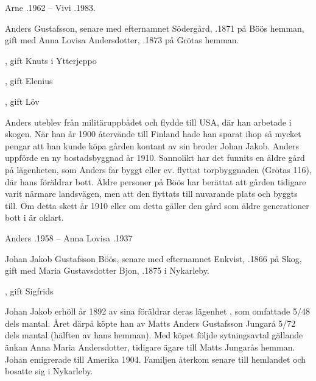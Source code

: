 Arne .1962  --  Vivi .1983.


Anders Gustafsson, senare med efternamnet Södergård, .1871 på Böös hemman, gift med Anna Lovisa Andersdotter, .1873 på Grötas hemman.
\begin{jhchildren}
  \item {}, gift Knuts i Ytterjeppo
  \item {}
  \item {}
  \item {}, gift Elenius
  \item {}, gift Löv
  \item {}
\end{jhchildren}
Anders uteblev från militäruppbådet och flydde till USA, där han arbetade i skogen. När han år 1900 återvände till Finland hade han sparat ihop så mycket pengar att han kunde köpa gården kontant av sin broder Johan Jakob. Anders uppförde en ny bostadsbyggnad år 1910. Sannolikt har det funnits en äldre gård på lägenheten, som Anders far byggt eller ev. flyttat torpbyggnaden (Grötas 116), där hans föräldrar bott. Äldre personer på Böös har berättat att gården tidigare varit närmare landsvägen, men att den flyttats till nuvarande plats och byggts till. Om detta skett år 1910 eller om detta gäller den gård som äldre generationer bott i är oklart.

Anders .1958  --  Anna Lovisa .1937


Johan Jakob Gustafsson Böös, senare med efternamnet Enkvist, .1866 på Skog, gift med Maria Gustavsdotter Bjon, .1875 i Nykarleby.
\begin{jhchildren}
  \item {}
  \item {}, gift Sigfrids
\end{jhchildren}
Johan Jakob erhöll år 1892 av sina föräldrar deras lägenhet , som omfattade 5/48 dels mantal. Året därpå köpte han av Matts Anders Gustafsson Jungarå 5/72 dels mantal (hälften av hans hemman). Med köpet följde sytningsavtal gällande änkan Anna Maria Andersdotter, tidigare ägare till Matts Jungarås hemman. Johan emigrerade till Amerika 1904. Familjen återkom senare till hemlandet och bosatte sig i Nykarleby.


